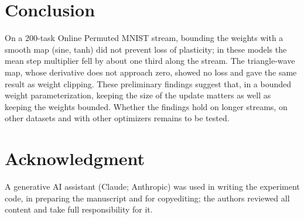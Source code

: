 \documentclass[conference,a4paper]{IEEEtran}
\begin{document}
\section{Conclusion}

On a 200-task Online Permuted MNIST stream, bounding the weights with a smooth map (sine, tanh) did not prevent
loss of plasticity; in these models the mean step multiplier fell by about one third along the stream. The
triangle-wave map, whose derivative does not approach zero, showed no loss and gave the same result as weight
clipping. These preliminary findings suggest that, in a bounded weight parameterization, keeping the size of the update matters as well as keeping the weights bounded. Whether the findings hold on longer streams, on other
datasets and with other optimizers remains to be tested.

\section*{Acknowledgment}

A generative AI assistant (Claude; Anthropic) was used in writing the experiment code, in preparing the manuscript and for copyediting; the authors
reviewed all content and take full responsibility for it.



\end{document}
